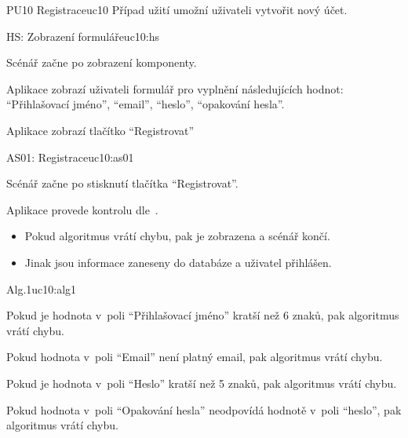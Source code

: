 \begin{usecase}{PU10 Registrace}{uc10}
    Případ užití umožní uživateli vytvořit nový účet.

    \begin{scenario}{HS: Zobrazení formuláře}{uc10:hs}
        \item Scénář začne po zobrazení komponenty.
        \item Aplikace zobrazí uživateli formulář pro vyplnění následujících hodnot: \enquote{Přihlašovací jméno}, \enquote{email}, \enquote{heslo}, \enquote{opakování hesla}.
        \item Aplikace zobrazí tlačítko \enquote{Registrovat}
    \end{scenario}

    \begin{scenario}{AS01: Registrace}{uc10:as01}
        \item Scénář začne po stisknutí tlačítka \enquote{Registrovat}.
        \item Aplikace provede kontrolu dle~.
        \begin{itemize}
            \item Pokud algoritmus vrátí chybu, pak je zobrazena a scénář končí.
            \item Jinak jsou informace zaneseny do databáze a uživatel přihlášen.
        \end{itemize}
    \end{scenario}

    \begin{scenario}{Alg.1}{uc10:alg1}
        \item Pokud je hodnota v~poli \enquote{Přihlašovací jméno} kratší než 6 znaků, pak algoritmus vrátí chybu.
        \item Pokud hodnota v~poli \enquote{Email} není platný email, pak algoritmus vrátí chybu.
        \item Pokud je hodnota v~poli \enquote{Heslo} kratší než 5 znaků, pak algoritmus vrátí chybu.
        \item Pokud hodnota v~poli \enquote{Opakování hesla} neodpovídá hodnotě v~poli \enquote{heslo}, pak algoritmus vrátí chybu.
    \end{scenario}
\end{usecase}